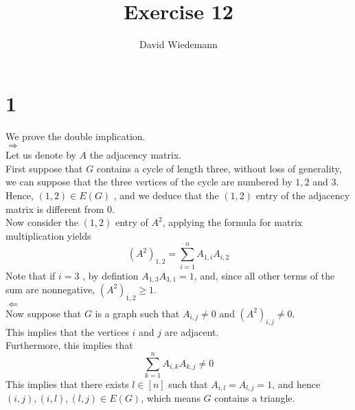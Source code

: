 \documentclass[11pt, a4paper]{article}
\begin{document}
\title{Exercise 12}
\author{David Wiedemann}
\maketitle
\section*{1}
We prove the double implication.\\
$ \Rightarrow $ \\
Let us denote by $A$ the adjacency matrix.\\
First suppose that $G$ contains a cycle of length three, without loss of generality, we can suppose that the three vertices of the cycle are numbered by $1,2$ and $3.$ \\
Hence, $ ( 1,2) \in E( G) $ , and we deduce that the $( 1,2) $ entry of the adjacency matrix is different from 0.\\
Now consider the $( 1,2) $ entry of $A^{2}$, applying the formula for matrix multiplication yields
\[ 
\left( A^{2} \right)_{1,2} = \sum_{i=1}^{ n} A_{1,i} A_{i,2} 
\]
Note that if $i=3$ , by defintion $A_{1,3} A_{3,1} =1$, and, since all other terms of the sum are nonnegative, $ ( A^{2}) _{1,2} \geq 1$.\\
$\Leftarrow$ \\
Now suppose that $G$ is a graph such that $A_{i,j} \neq 0$ and $( A^{2}) _{i,j} \neq 0 $.\\
This implies that the vertices $i $ and $j$ are adjacent.\\
Furthermore, this implies that
\[ 
\sum_{k=1}^{ n}A_{i,k} A_{k,j} \neq 0
\]
This implies that there exists $l \in [ n] $ such that $A_{i,l} = A_{l,j} = 1$, and hence $ ( i,j) , ( i,l) , ( l,j) \in E( G) $, which means $G$ contains a triangle.
\end{document}
